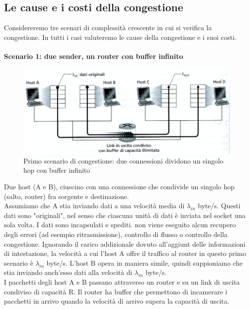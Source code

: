 \documentclass[11pt,a4paper]{book}
\begin{document}
\subsection{Le cause e i costi della congestione}
Considereremo tre scenari di complessità crescente in cui si verifica la congestione. In tutti i casi valuteremo le cause della congestione e i suoi costi.
\paragraph{Scenario 1: due sender, un router con buffer infinito}
\begin{figure}
	\includegraphics[scale=0.6]{img/039.png}
	\caption{Primo scenario di congestione: due connessioni dividono un singolo hop con buffer infinito}
\end{figure}
Due host (A e B), ciuscino con una connessione che condivide un singolo hop (salto, router) fra sorgente e destinazione.\\
Assumiamo che A stia inviando dati a una velocità media di $\lambda_{in}$ byte/s. Questi dati sono "originali", nel senso che ciascuna unità di dati è inviata nel socket una sola volta. I dati sono incapsulati e spediti. non viene eseguito alcun recupero degli errori (ad esempio ritrasmissione), controllo di flusso o controllo della congestione. Ignorando il carico addizionale dovuto all'aggiunt delle informazioni di intestazione, la velocità a cui l'host A offre il traffico al router in questo primo scenario è $\lambda_{in}$ byte/s. L'host B opera in maniera simile, quindi suppioniamo che stia inviando anch'esso dati alla velocità di $\lambda_{in}$ byte/s.\\
I pacchetti degli host A e B passano attraverso un router e su un link di uscita condiviso di capacità R. Il router ha buffer che permettono di incamerare i pacchetti in arrivo quando la velocità di arrivo supera la capacità di uscita. \\
\end{document}
